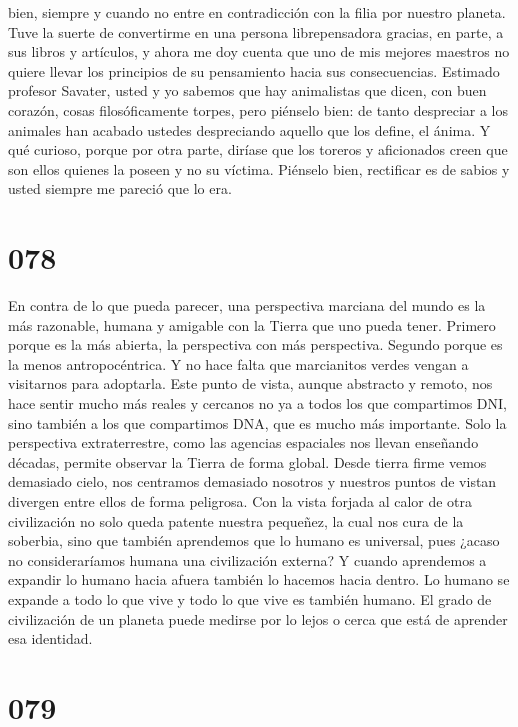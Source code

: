 \documentclass[a4paper,11pt,openright,twocolumn]{book}
\begin{document}
bien, siempre y cuando no entre en contradicción con la filia por nuestro planeta. Tuve la suerte de convertirme en una persona
librepensadora gracias, en parte, a sus libros y artículos, y ahora me doy cuenta que uno de mis mejores maestros no quiere llevar los
principios de su pensamiento hacia sus consecuencias. Estimado profesor Savater, usted y yo sabemos que hay animalistas que dicen,
con buen corazón, cosas filosóficamente torpes, pero piénselo bien: de tanto despreciar a los animales han acabado ustedes despreciando
aquello que los define, el ánima. Y qué curioso, porque por otra parte, diríase que los toreros y aficionados creen que son ellos quienes la
poseen y no su víctima. Piénselo bien, rectificar es de sabios y usted siempre me pareció que lo era. 


\section*{078}

En contra de lo que pueda parecer, una perspectiva marciana del mundo es la más razonable, humana y
amigable con la Tierra que uno pueda tener. Primero porque es la más abierta, la perspectiva con más
perspectiva. Segundo porque es la menos antropocéntrica. Y no hace falta que marcianitos verdes vengan
a visitarnos para adoptarla. Este punto de vista, aunque abstracto y remoto, nos hace sentir mucho más
reales y cercanos no ya a todos los que compartimos DNI, sino también a los que compartimos DNA, que es
mucho más importante. Solo la perspectiva extraterrestre, como las agencias espaciales nos llevan
enseñando décadas, permite observar la Tierra de forma global. Desde tierra firme vemos demasiado cielo,
nos centramos demasiado nosotros y nuestros puntos de vistan divergen entre ellos de forma peligrosa. Con la
vista forjada al calor de otra civilización no solo queda patente nuestra pequeñez, la cual nos cura
de la soberbia, sino que también aprendemos que lo humano es universal, pues ¿acaso no consideraríamos 
humana una civilización externa? Y cuando aprendemos a expandir lo humano hacia afuera también lo hacemos
hacia dentro. Lo humano se expande a todo lo que vive y todo lo que vive es también humano. El grado de
civilización de un planeta puede medirse por lo lejos o cerca que está de aprender esa identidad. 


\section*{079}
\end{document}
